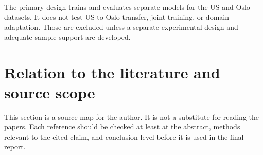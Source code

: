 \documentclass[11pt,a4paper]{article}
\begin{document}
The primary design trains and evaluates separate models for the US and Oslo datasets. It does not test US-to-Oslo transfer, joint training, or domain adaptation. Those are excluded unless a separate experimental design and adequate sample support are developed.

\section{Relation to the literature and source scope}
\label{sec:literature}

This section is a source map for the author. It is not a substitute for reading the papers. Each reference should be checked at least at the abstract, methods relevant to the cited claim, and conclusion level before it is used in the final report.
\end{document}
